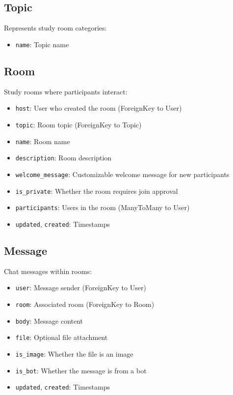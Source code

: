 \documentclass[11pt]{article}
\begin{document}
\subsection{Topic}
Represents study room categories:
\begin{itemize}
  \item \texttt{name}: Topic name
\end{itemize}

\subsection{Room}
Study rooms where participants interact:
\begin{itemize}
  \item \texttt{host}: User who created the room (ForeignKey to User)
  \item \texttt{topic}: Room topic (ForeignKey to Topic)
  \item \texttt{name}: Room name
  \item \texttt{description}: Room description
  \item \texttt{welcome\_message}: Customizable welcome message for new participants
  \item \texttt{is\_private}: Whether the room requires join approval
  \item \texttt{participants}: Users in the room (ManyToMany to User)
  \item \texttt{updated}, \texttt{created}: Timestamps
\end{itemize}

\subsection{Message}
Chat messages within rooms:
\begin{itemize}
  \item \texttt{user}: Message sender (ForeignKey to User)
  \item \texttt{room}: Associated room (ForeignKey to Room)
  \item \texttt{body}: Message content
  \item \texttt{file}: Optional file attachment
  \item \texttt{is\_image}: Whether the file is an image
  \item \texttt{is\_bot}: Whether the message is from a bot
  \item \texttt{updated}, \texttt{created}: Timestamps
\end{itemize}
\end{document}
